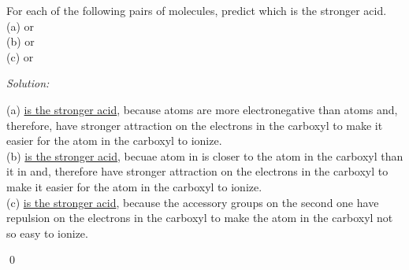 \documentclass[12pt]{article}
\newenvironment{problem}[2][Problem]{\begin{trivlist}
\item[\hskip \labelsep {\bfseries #1}\hskip \labelsep {\bfseries #2.}]}{\end{trivlist}}
\newenvironment{sol}
    {\emph{Solution:}
    }
    {
    \qed
    }
\begin{document}
\begin{problem}{15.75}
For each of the following pairs of molecules, predict which is the stronger acid.\\
(a)  or \\
(b)  or \\
(c)  or 
\end{problem}
\begin{sol}
(a) \uline{ is the stronger acid}, because atoms  are more electronegative than atoms  and, therefore, have stronger attraction on the electrons in the carboxyl to make it easier for the atom  in the carboxyl to ionize.\\
(b) \uline{ is the stronger acid}, becuae atom  in  is closer to the atom  in the carboxyl than it in  and, therefore have stronger attraction on the electrons in the carboxyl to make it easier for the atom  in the carboxyl to ionize.\\
(c) \uline{ is the stronger acid}, because the accessory groups on the second one have repulsion on the electrons in the carboxyl to make the atom  in the carboxyl not so easy to ionize.
\end{sol}
\end{document}
